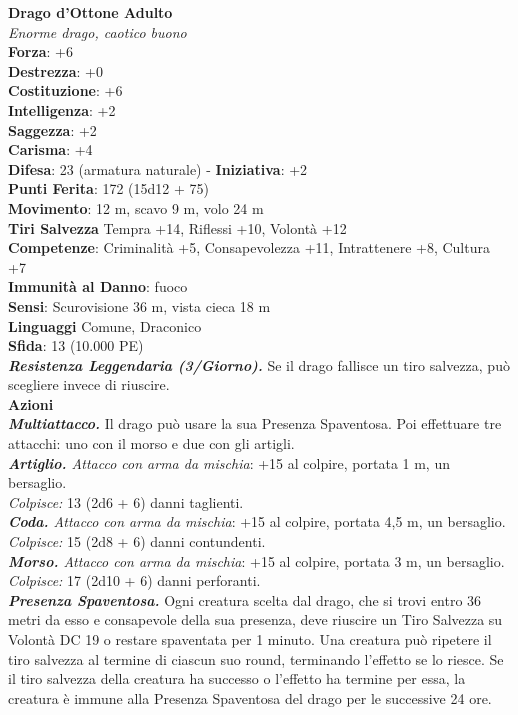 \begin{multicols}{2}
\medskip\textbf{Drago d'Ottone Adulto}\\
\emph{Enorme drago, caotico buono}\\
\textbf{Forza}: +6\\
\textbf{Destrezza}: +0\\
\textbf{Costituzione}: +6\\
\textbf{Intelligenza}: +2\\
\textbf{Saggezza}: +2\\
\textbf{Carisma}: +4\\
\textbf{Difesa}: 23 (armatura naturale) - \textbf{Iniziativa}: +2\\
\textbf{Punti Ferita}: 172 (15d12 + 75)\\
\textbf{Movimento}: 12 m, scavo 9 m, volo 24 m\\
\textbf{Tiri Salvezza} Tempra +14, Riflessi +10, Volontà +12\\
\textbf{Competenze}: Criminalità +5, Consapevolezza +11, Intrattenere +8, Cultura +7\\
\textbf{Immunità al Danno}: fuoco\\
\textbf{Sensi}: Scurovisione 36 m, vista cieca 18 m\\
\textbf{Linguaggi} Comune, Draconico\\
\textbf{Sfida}: 13 (10.000 PE)\smallskip\\
\emph{\textbf{Resistenza Leggendaria (3/Giorno).}} Se il drago fallisce un tiro salvezza, può scegliere invece di riuscire.\\
\smallskip\textbf{Azioni}\\
\emph{\textbf{Multiattacco.}} Il drago può usare la sua Presenza Spaventosa. Poi effettuare tre attacchi: uno con il morso e due con gli artigli.\\
\emph{\textbf{Artiglio.} Attacco con arma da mischia}: +15 al colpire, portata 1 m, un bersaglio.\\
\emph{Colpisce:} 13 (2d6 + 6) danni taglienti.\\
\emph{\textbf{Coda.} Attacco con arma da mischia}: +15 al colpire, portata 4,5 m, un bersaglio.\\
\emph{Colpisce:} 15 (2d8 + 6) danni contundenti.\\
\emph{\textbf{Morso.} Attacco con arma da mischia}: +15 al colpire, portata 3 m, un bersaglio.\\
\emph{Colpisce:} 17 (2d10 + 6) danni perforanti.\\
\emph{\textbf{Presenza Spaventosa.}} Ogni creatura scelta dal drago, che si trovi entro 36 metri da esso e consapevole della sua presenza, deve riuscire un Tiro Salvezza su Volontà DC  19 o restare spaventata per 1 minuto. Una creatura può ripetere il tiro salvezza al termine di ciascun suo round, terminando l'effetto se lo riesce. Se il tiro salvezza della creatura ha successo o l'effetto ha termine per essa, la creatura è immune alla Presenza Spaventosa del drago per le successive 24 ore.\\

\end{multicols}
